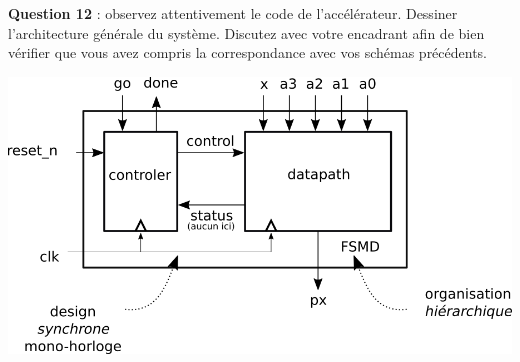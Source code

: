 \documentclass[a4paper,11pt]{exam}
\begin{document}
\begin{questions}
  \question \textbf{Question 12} : observez attentivement le code de l'accélérateur.  Dessiner l'architecture générale du système. Discutez avec votre encadrant afin de bien vérifier que vous avez compris la correspondance avec vos schémas précédents.
  \begin{solution}
    \begin{center}
      \includegraphics[scale=0.4]{fsmd.png}
    \end{center}
  \end{solution}


\end{questions}
\end{document}
